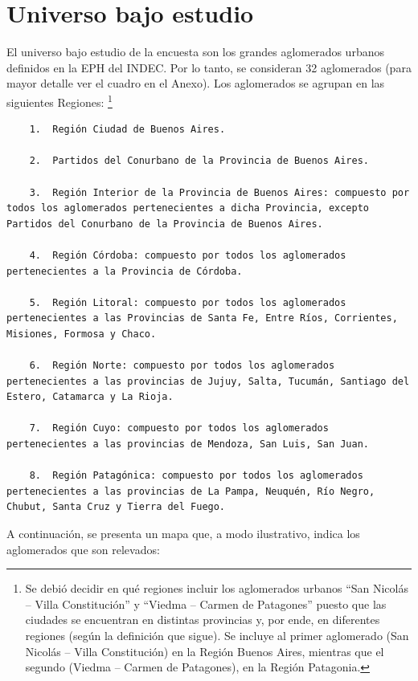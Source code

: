 \documentclass[
  openany]{book}
\begin{document}
\hypertarget{universo-bajo-estudio}{%
\section{Universo bajo estudio}\label{universo-bajo-estudio}}

El universo bajo estudio de la encuesta son los grandes aglomerados urbanos definidos en la EPH del INDEC. Por lo tanto, se consideran 32 aglomerados (para mayor detalle ver el cuadro en el Anexo). Los aglomerados se agrupan en las siguientes Regiones: \footnote{Se debió decidir en qué regiones incluir los aglomerados urbanos ``San Nicolás -- Villa Constitución'' y ``Viedma -- Carmen de Patagones'' puesto que las ciudades se encuentran en distintas provincias y, por ende, en diferentes regiones (según la definición que sigue). Se incluye al primer aglomerado (San Nicolás -- Villa Constitución) en la Región Buenos Aires, mientras que el segundo (Viedma -- Carmen de Patagones), en la Región Patagonia.}

\begin{verbatim}
    1.  Región Ciudad de Buenos Aires.
    
    2.  Partidos del Conurbano de la Provincia de Buenos Aires.
    
    3.  Región Interior de la Provincia de Buenos Aires: compuesto por todos los aglomerados pertenecientes a dicha Provincia, excepto Partidos del Conurbano de la Provincia de Buenos Aires.
    
    4.  Región Córdoba: compuesto por todos los aglomerados pertenecientes a la Provincia de Córdoba.
    
    5.  Región Litoral: compuesto por todos los aglomerados pertenecientes a las Provincias de Santa Fe, Entre Ríos, Corrientes, Misiones, Formosa y Chaco.
    
    6.  Región Norte: compuesto por todos los aglomerados pertenecientes a las provincias de Jujuy, Salta, Tucumán, Santiago del Estero, Catamarca y La Rioja.
    
    7.  Región Cuyo: compuesto por todos los aglomerados pertenecientes a las provincias de Mendoza, San Luis, San Juan.
    
    8.  Región Patagónica: compuesto por todos los aglomerados pertenecientes a las provincias de La Pampa, Neuquén, Río Negro, Chubut, Santa Cruz y Tierra del Fuego.
\end{verbatim}

A continuación, se presenta un mapa que, a modo ilustrativo, indica los aglomerados que son relevados:
\end{document}
